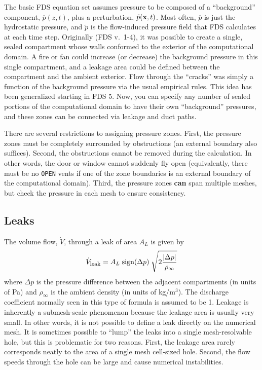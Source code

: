 \documentclass[11pt]{book}
\newcommand{\ct}{\tt\small}
\newcommand{\bx}{{\bf x}}
\newcommand{\tp}{\tilde{p}}
\newcommand{\bp}{\overline{p}}
\newcommand{\be}{\begin{equation}}
\newcommand{\ee}{\end{equation}}
\begin{document}
The basic FDS equation set assumes pressure
to be composed of a ``background'' component, $\bp(z,t)$, plus a perturbation, $\tp(\bx,t)$. Most
often, $\bp$ is just the hydrostatic pressure, and $\tp$ is the flow-induced pressure field that
FDS calculates at each time step. Originally (FDS v.~1-4), it was possible to create a single, sealed
compartment whose walls conformed to the exterior of the computational domain. A fire or fan could
increase (or decrease) the background pressure in this single compartment, and a leakage area could
be defined between the compartment and the ambient exterior. Flow through the ``cracks'' was simply
a function of the background pressure via the usual empirical rules.
This idea has been generalized starting in FDS 5. Now, you can specify any number of sealed portions of the computational
domain to have their own ``background'' pressures, and these zones can be connected via leakage and duct paths.

There are several restrictions to assigning pressure zones. First, the pressure zones must be completely surrounded by
obstructions (an external boundary also suffices).
Second, the obstructions cannot be removed during the calculation. In other words, the door or window cannot
suddenly fly open (equivalently, there must be no {\ct OPEN} vents if one of the zone boundaries
is an external boundary of the computational domain).
Third, the pressure zones {\bf can} span multiple meshes,
but check the pressure in each mesh to ensure consistency.


\subsection{Leaks}
\label{info:Leaks}

The volume flow, $\dot{V}$, through a leak of area $A_L$ is given by
\be  \dot{V}_{\hbox{\footnotesize leak}} = A_L \; \hbox{sign} (\Delta p) \; \sqrt{2 \frac{ | \Delta p |}{\rho_\infty}} \ee
where $\Delta p$ is the pressure difference between the adjacent compartments (in units of Pa) and
$\rho_\infty$ is the ambient density (in units of kg/m$^3$). The discharge coefficient normally seen in this type of formula is assumed
to be 1. Leakage is inherently a submesh-scale phenomenon because the leakage area is usually very small. In other words, it is not possible to define a leak directly on the
numerical mesh. It is sometimes possible to ``lump'' the leaks into a single mesh-resolvable hole, but this is problematic
for two reasons. First, the leakage area rarely corresponds neatly to the area of a single mesh cell-sized hole. Second, the
flow speeds through the hole can be large and cause numerical instabilities.
\end{document}
